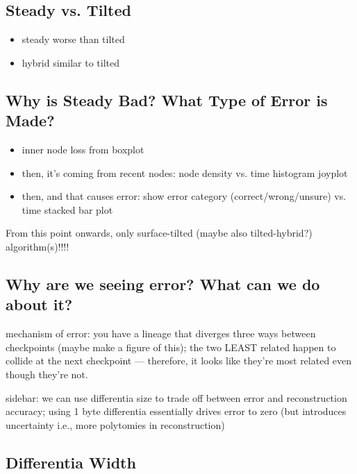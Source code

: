 \subsection{Steady vs. Tilted} \label{sec:steady-vs-tilted}
\begin{itemize}
    \item steady worse than tilted
    \item hybrid similar to tilted
\end{itemize}



\subsection{Why is Steady Bad? What Type of Error is Made?} \label{sec:error-analysis}
\begin{itemize}
    \item inner node loss from boxplot
    \item then, it's coming from recent nodes: node density vs. time histogram joyplot
    \item then, and that causes error: show error category (correct/wrong/unsure) vs. time stacked bar plot
\end{itemize}

From this point onwards, only surface-tilted (maybe also tilted-hybrid?) algorithm(s)!!!!

\subsection{Why are we seeing error? What can we do about it?} \label{sec:error-uncertainty}

mechanism of error: you have a lineage that diverges three ways between checkpoints (maybe make a figure of this); the two LEAST related happen to collide at the next checkpoint --- therefore, it looks like they're most related even though they're not.

sidebar: we can use differentia size to trade off between error and reconstruction accuracy; using 1 byte differentia essentially drives error to zero (but introduces uncertainty i.e., more polytomies in reconstruction)

\subsection{Differentia Width} \label{sec:bit-vs-byte}



